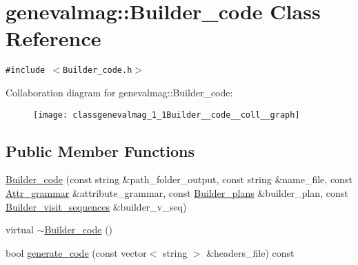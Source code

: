 \hypertarget{classgenevalmag_1_1Builder__code}{
\section{genevalmag::Builder\_\-code Class Reference}
\label{classgenevalmag_1_1Builder__code}
}
{\tt \#include $<$Builder\_\-code.h$>$}

Collaboration diagram for genevalmag::Builder\_\-code:\nopagebreak
\begin{figure}[H]
\begin{center}
\leavevmode
\texttt{[image: classgenevalmag\_1\_1Builder\_\_code\_\_coll\_\_graph]}
\end{center}
\end{figure}
\subsection*{Public Member Functions}
\begin{CompactItemize}
\item 
\hyperlink{classgenevalmag_1_1Builder__code_0d3743b15ad07d8e8cbe40a8fece97bf}{Builder\_\-code} (const string \&path\_\-folder\_\-output, const string \&name\_\-file, const \hyperlink{classgenevalmag_1_1Attr__grammar}{Attr\_\-grammar} \&attribute\_\-grammar, const \hyperlink{classgenevalmag_1_1Builder__plans}{Builder\_\-plans} \&builder\_\-plan, const \hyperlink{classgenevalmag_1_1Builder__visit__sequences}{Builder\_\-visit\_\-sequences} \&builder\_\-v\_\-seq)
\item 
virtual \hyperlink{classgenevalmag_1_1Builder__code_9e6e4ec3399e378cc691e69d7ab5c278}{$\sim$Builder\_\-code} ()
\item 
bool \hyperlink{classgenevalmag_1_1Builder__code_9f79ad68269841d1149eeca4a19b4747}{generate\_\-code} (const vector$<$ string $>$ \&headers\_\-file) const 
\end{CompactItemize}
